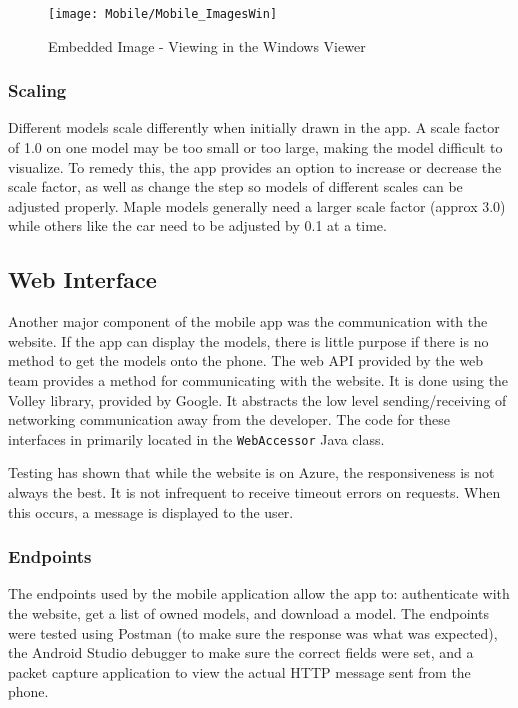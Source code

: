             \begin{figure}[H]
                \texttt{[image: Mobile/Mobile\_ImagesWin]}
                \centering
                \caption{Embedded Image - Viewing in the Windows Viewer}
                \label{fig:mobileEmbeddedWindows}
            \end{figure}

        \subsubsection{Scaling}

            Different models scale differently when initially drawn in the app. A scale factor of 1.0 on one model may be too small or too large, making the model difficult to visualize. To remedy this, the app provides an option to increase or decrease the scale factor, as well as change the step so models of different scales can be adjusted properly. Maple models generally need a larger scale factor (approx 3.0) while others like the car need to be adjusted by 0.1 at a time.
        
    \subsection{Web Interface}

        Another major component of the mobile app was the communication with the website.  If the app can display the models, there is little purpose if there is no method to get the models onto the phone.  The web API provided by the web team provides a method for communicating with the website.  It is done using the Volley library, provided by Google.  It abstracts the low level sending/receiving of networking communication away from the developer.  The code for these interfaces in primarily located in the \texttt{WebAccessor} Java class.

        Testing has shown that while the website is on Azure, the responsiveness is not always the best.  It is not infrequent to receive timeout errors on requests.  When this occurs, a message is displayed to the user.
        
        \subsubsection{Endpoints}\label{sec:Mobile_Auth}
        
            The endpoints used by the mobile application allow the app to: authenticate with the website, get a list of owned models, and download a model.  The endpoints were tested using Postman (to make sure the response was what was expected), the Android Studio debugger to make sure the correct fields were set, and a packet capture application to view the actual HTTP message sent from the phone.

